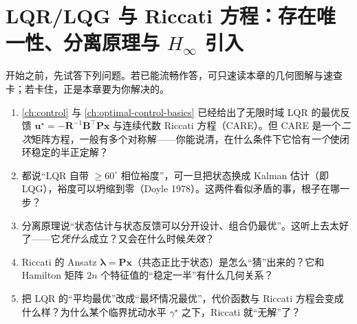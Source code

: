 \chapter{LQR/LQG 与 Riccati 方程：存在唯一性、分离原理与 \texorpdfstring{$H_\infty$}{H-infinity} 引入}
\label{ch:lqr-lqg-riccati}


\begin{practice}[前置自测]
开始之前，先试答下列问题。若已能流畅作答，可只速读本章的几何图解与速查卡；若卡住，正是本章要为你解决的。
\begin{enumerate}
  \item \cref{ch:control} 与 \cref{ch:optimal-control-basics} 已经给出了无限时域 LQR 的最优反馈 $\mathbf u^\star=-\mathbf R^{-1}\mathbf B^\top\mathbf P\mathbf x$ 与连续代数 Riccati 方程（CARE）。但 CARE 是一个\emph{二次}矩阵方程，一般有多个对称解——你能说清，在什么条件下它恰有\emph{一个}使闭环稳定的半正定解？
  \item 都说“LQR 自带 $\ge60^\circ$ 相位裕度”，可一旦把状态换成 Kalman 估计（即 LQG），裕度可以坍缩到零（Doyle 1978）。这两件看似矛盾的事，根子在哪一步？
  \item 分离原理说“状态估计与状态反馈可以分开设计、组合仍最优”。这听上去太好了——它\emph{凭什么}成立？又会在什么时候\emph{失效}？
  \item Riccati 的 Ansatz $\boldsymbol\lambda=\mathbf P\mathbf x$（共态正比于状态）是怎么“猜”出来的？它和 Hamilton 矩阵 $2n$ 个特征值的“稳定一半”有什么几何关系？
  \item 把 LQR 的“平均最优”改成“最坏情况最优”，代价函数与 Riccati 方程会变成什么样？为什么某个临界扰动水平 $\gamma^\star$ 之下，Riccati 就“无解”了？
\end{enumerate}
\end{practice}

